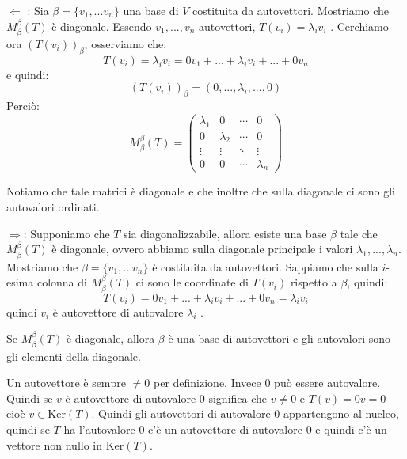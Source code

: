 \documentclass[
  a4paper,
]{article}
\begin{document}
\begin{proofbox}
\(\Leftarrow\) : Sia \(\beta = \{v_1, ... v_n\}\) una base di \(V\)
costituita da autovettori. Mostriamo che \(M^{{\beta}}_{\beta}(T)\) è
diagonale. Essendo \(v_1, ..., v_n\) autovettori,
\(T(v_i) = \lambda_i v_i\) . Cerchiamo ora \((T(v_i))_{\beta}\),
osserviamo che: \[
T(v_i) = \lambda_i v_i = 0 v_1 + ... + \lambda_i v_i + ... + 0 v_n
\] e quindi: \[
(T(v_i))_{\beta} = (0 , ... , \lambda_i , ... , 0)
\] Perciò: \[
M^{{\beta}}_{\beta}(T) =
\begin{pmatrix}
\lambda_1 & 0 & \cdots & 0\\
0 & \lambda_2 & \cdots & 0\\
\vdots & \vdots & \ddots & \vdots\\
0 & 0 & \cdots & \lambda_n
\end{pmatrix}
\]

Notiamo che tale matrici è diagonale e che inoltre che sulla diagonale
ci sono gli autovalori ordinati.

\bigskip

\(\Rightarrow\): Supponiamo che \(T\) sia diagonalizzabile, allora
esiste una base \(\beta\) tale che \(M^{{\beta}}_{\beta}(T)\) è
diagonale, ovvero abbiamo sulla diagonale principale i valori
\(\lambda_1, ..., \lambda_n\). Mostriamo che \(\beta = \{v_1, ...v_n\}\)
è costituita da autovettori. Sappiamo che sulla \(i\)-esima colonna di
\(M^{{\beta}}_{\beta}(T)\) ci sono le coordinate di \(T(v_i)\) rispetto
a \(\beta\), quindi: \[
T(v_i) = 0 v_1 + ... + \lambda_i v_i + ... + 0 v_n = \lambda_i v_i
\] quindi \(v_i\) è autovettore di autovalore \(\lambda_i\) .
\end{proofbox}

\begin{observationbox}
Se \(M^{{\beta}}_{\beta}(T)\) è diagonale, allora \(\beta\) è una base
di autovettori e gli autovalori sono gli elementi della diagonale.
\end{observationbox}

\begin{observationbox}
Un autovettore è sempre \(\not = \underline{0}\) per definizione. Invece
\(0\) può essere autovalore. Quindi se \(v\) è autovettore di autovalore
\(0\) significa che \(v \not = 0\) e \(T(v) = 0v = \underline{0}\) cioè
\(v \in \text{Ker}(T)\). Quindi gli autovettori di autovalore \(0\)
appartengono al nucleo, quindi se \(T\) ha l'autovalore \(0\) c'è un
autovettore di autovalore \(0\) e quindi c'è un vettore non nullo in
\(\text{Ker}(T)\).
\end{observationbox}
\end{document}
